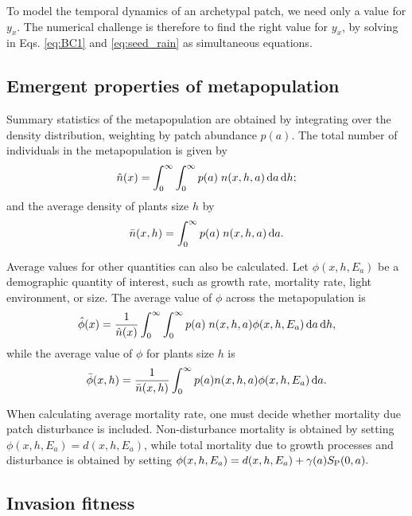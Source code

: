 \documentclass[10pt,twoside]{article}
\begin{document}
To model the temporal dynamics of an archetypal patch, we need only a
value for \(y_x\). The numerical challenge is therefore to find the
right value for \(y_x\), by solving in Eqs. \ref{eq:BC1} and
\ref{eq:seed_rain} as simultaneous equations.

\subsection{Emergent properties of
metapopulation}\label{emergent-properties-of-metapopulation}

Summary statistics of the metapopulation are obtained by integrating
over the density distribution, weighting by patch abundance \(p(a)\).
The total number of individuals in the metapopulation is given by
\begin{equation}
  \hat{n}(x) = \int_{0}^{\infty} \int_{0}^{\infty}p(a) \; n(x,h,a) \, {\rm d}a \, {\rm d}h;
\end{equation}
and the average density of plants size \(h\) by
\begin{equation}
  \bar{n}(x,h) = \int_{0}^{\infty}p(a) \; n(x,h,a) \, {\rm d}a.
\end{equation}

Average values for other quantities can also be calculated. Let
\(\phi(x, h, E_a)\) be a demographic quantity of interest, such as
growth rate, mortality rate, light environment, or size. The average
value of \(\phi\) across the metapopulation is
\begin{equation}
  \hat{\phi}(x) = \frac1{\hat{n}(x) }\int_{0}^{\infty} \int_{0}^{\infty} p(a) \; n(x,h,a) \phi(x,h,E_a) \, {\rm d}a \, {\rm d}h,
\end{equation}
while the average value of \(\phi\) for plants size \(h\) is
\begin{equation}\bar{\phi}(x,h) = \frac1{\bar{n}(x,h) }\int_{0}^{\infty}p(a)  n(x,h,a) \phi(x,h,E_a)\, {\rm d}a.
\end{equation}

When calculating average mortality rate, one must decide whether
mortality due patch disturbance is included. Non-disturbance mortality
is obtained by setting \(\phi(x,h, E_a) = d(x,h,E_a)\), while total
mortality due to growth processes and disturbance is obtained by setting
\(\phi(x,h, E_a) = d(x,h,E_a)+ \gamma(a) S_{\rm P}(0,a).\)

\subsection{Invasion fitness}\label{invasion-fitness}
\end{document}
